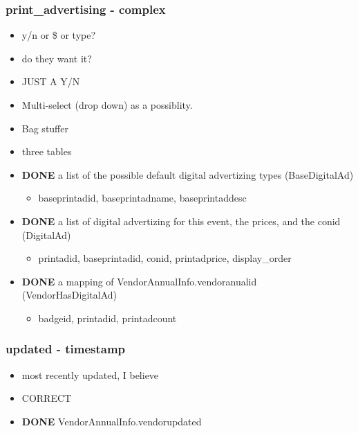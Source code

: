 \documentclass[captions=tablesignature]{scrartcl}
\begin{document}
\subsubsection{print\_advertising - complex}
\label{sec-2-2-7}
\begin{itemize}
\item y/n or \$ or type?
\item do they want it?
\item JUST A Y/N
\item Multi-select (drop down) as a possiblity.
\item Bag stuffer
\item three tables
\end{itemize}
\begin{itemize}
\item {\bfseries\sffamily DONE} a list of the possible default digital advertizing types (BaseDigitalAd)
\label{sec-2-2-7-1}
\begin{itemize}
\item baseprintadid, baseprintadname, baseprintaddesc
\end{itemize}

\item {\bfseries\sffamily DONE} a list of digital advertizing for this event, the prices, and the conid (DigitalAd)
\label{sec-2-2-7-2}
\begin{itemize}
\item printadid, baseprintadid, conid, printadprice, display\_order
\end{itemize}

\item {\bfseries\sffamily DONE} a mapping of VendorAnnualInfo.vendoranualid (VendorHasDigitalAd)
\label{sec-2-2-7-3}
\begin{itemize}
\item badgeid, printadid, printadcount
\end{itemize}
\end{itemize}

\subsubsection{updated - timestamp}
\label{sec-2-2-8}
\begin{itemize}
\item most recently updated, I believe
\item CORRECT
\end{itemize}
\begin{itemize}
\item {\bfseries\sffamily DONE} VendorAnnualInfo.vendorupdated
\label{sec-2-2-8-1}
\end{itemize}
\end{document}

